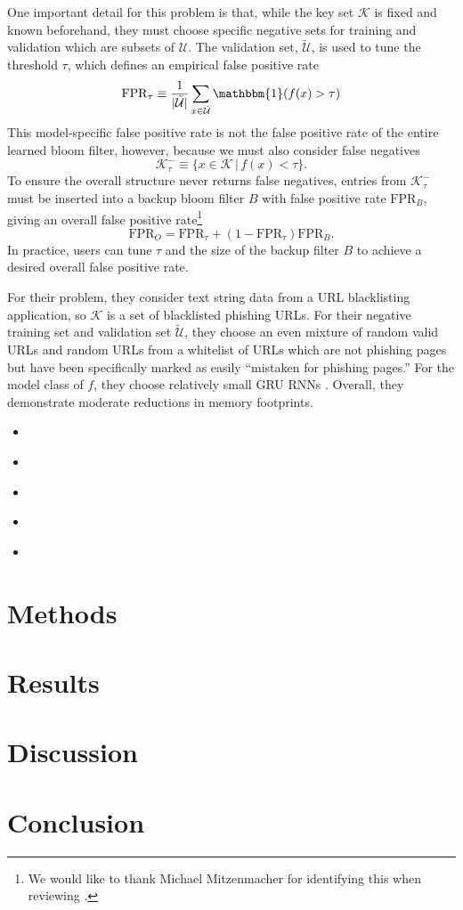 \documentclass{article}
\newcommand{\tU}{\tilde{\mathcal{U}}}
\begin{document}
One important detail for this problem is that, while the key set $\mathcal{K}$
is fixed and known beforehand, they must choose specific negative sets for
training and validation which are subsets of $\mathcal{U}$. The validation set,
$\tU$, is used to tune the threshold $\tau$, which defines an empirical false
positive rate \begin{equation}
  \mathrm{FPR}_\tau \equiv \frac{1}{|\tU|} \sum_{x \in \tU} \mathbbm{1}(f(x) > \tau)
\end{equation}
This model-specific false positive rate is not the false positive rate of the
entire learned bloom filter, however, because we must also consider false
negatives \begin{equation}
  \mathcal{K}_{\tau}^{-} \equiv \{ x \in \mathcal{K} \,|\, f(x) < \tau \}.
\end{equation}
To ensure the overall structure never returns false negatives, entries from
$\mathcal{K}_{\tau}^{-}$ must be inserted into a backup bloom filter $B$ with
false positive rate $\mathrm{FPR}_B$, giving an overall false positive
rate\footnote{We would like to thank Michael Mitzenmacher for identifying this
when reviewing \citet{kraska2018case}.} \begin{equation}
  \mathrm{FPR}_O = \mathrm{FPR}_\tau + (1 - \mathrm{FPR}_\tau)\mathrm{FPR}_B.
\end{equation}
In practice, users can tune $\tau$ and the size of the backup filter $B$ to
achieve a desired overall false positive rate.

For their problem, they consider text string data from a URL blacklisting
application, so $\mathcal{K}$ is a set of blacklisted phishing URLs. For their
negative training set and validation set $\tU$, they choose an even mixture of
random valid URLs and random URLs from a whitelist of URLs which are not
phishing pages but have been specifically marked as easily ``mistaken for
phishing pages.'' For the model class of $f$, they choose relatively small GRU
RNNs \citep{cho2014learning}. Overall, they demonstrate moderate reductions in
memory footprints.

\begin{itemize}
    \item \cite{rae2019meta}
    \item \cite{hadian2019considerations}
    \item \cite{mitzenmacher2018model}
    \item \cite{mitzenmacher2018model2}
    \item \cite{liangempirical}
\end{itemize}

\section{Methods}

\section{Results}

\section{Discussion}

\section{Conclusion}



\end{document}
